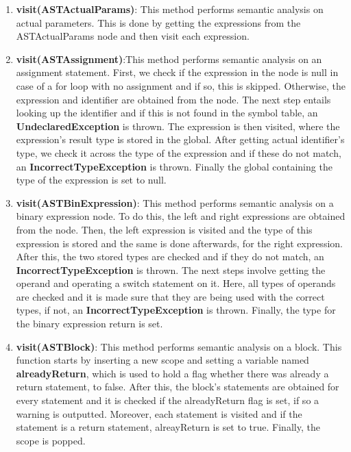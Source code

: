 \documentclass{article}
\begin{document}
			\begin{enumerate}
				\item \textbf{visit(ASTActualParams)}: This method performs semantic analysis on actual parameters. This is done by getting the expressions from the ASTActualParams node and then visit each expression.
				
					\item \textbf{visit(ASTAssignment)}:This method performs semantic analysis on an assignment statement. First, we check if the expression in the node is null in case of a for loop with no assignment and if so, this is skipped. Otherwise, the expression and identifier are obtained from the node. The next step entails looking up the identifier and if this is not found in the symbol table, an \textbf{UndeclaredException} is thrown. The expression is then visited, where the expression's result type is stored in the global. After getting actual identifier's type, we check it across the type of the expression and if these do not match, an \textbf{IncorrectTypeException} is thrown. Finally the global containing the type of the expression is set to null.
			
					\item \textbf{visit(ASTBinExpression)}: This method performs semantic analysis on a binary expression node. To do this, the left and right expressions are obtained from the node. Then, the left expression is visited and the type of this expression is stored and the same is done afterwards, for the right expression. After this, the two stored types are checked and if they do not match, an \textbf{IncorrectTypeException} is thrown. The next steps involve getting the operand and operating a switch statement on it. Here, all types of operands are checked and it is made sure that they are being used with the correct types, if not,  an \textbf{IncorrectTypeException} is thrown. Finally, the type for the binary expression return is set.
			
					\item \textbf{visit(ASTBlock)}: This method performs semantic analysis on a block. This function starts by inserting a new scope and setting a variable named \textbf{alreadyReturn}, which is used to hold a flag whether there was already a return statement, to false. After this, the block's statements are obtained for every statement and it is checked if the alreadyReturn flag is set, if so a warning is outputted. Moreover, each statement is visited and if the statement is a return statement, alreayReturn is set to true. Finally, the scope is popped.
			

\end{enumerate}
\end{document}
